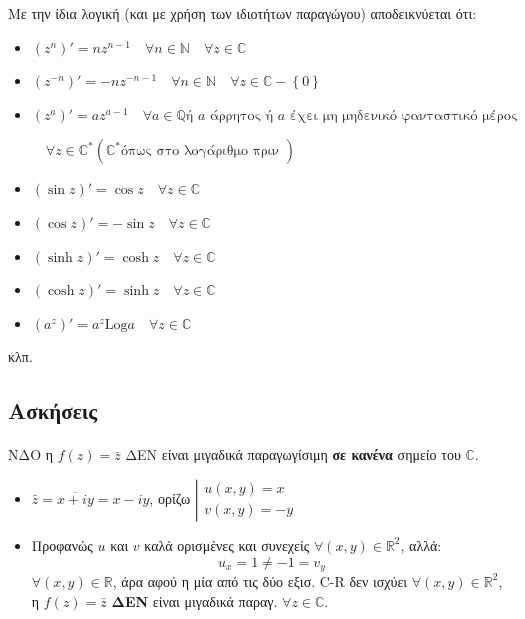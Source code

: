 \documentclass[12pt,a4paper,notitlepage,fleqn]{article}
\begin{document}
	 Με την ίδια λογική (και με χρήση των ιδιοτήτων παραγώγου) αποδεικνύεται ότι:
	 \begin{itemize}
	 	\item \( (z^n)' =nz^{n-1}\quad \forall n\in\mathbb N \quad \forall z\in\mathbb C \)
	 	\item \(
	 	(z^{-n})' = -nz^{-n-1}\quad\forall n\in\mathbb N \quad\forall z\in
	 	\mathbb C - \left\lbrace 0 \right\rbrace
	 	 \)
	    \item \(
	    (z^a)'=az^{a-1}\quad\forall a\in\mathbb Q \text{
	    	ή $a$ άρρητος ή $a$ έχει μη μηδενικό φανταστικό μέρος
	    	}
	     \)
	     
	     \( \quad \forall z\in\mathbb C^* (\mathbb C^* \text{
	     	όπως στο λογάριθμο πριν
	     }) \)
	    \item \( (\sin z)'=\cos z\quad\forall z\in\mathbb C  \)
	    \item \( (\cos z)'=-\sin z \quad\forall z\in\mathbb C  \)
	    \item \( (\sinh z)' = \cosh z\quad\forall z\in\mathbb C \)
	    \item \( (\cosh z)' = \sinh z\quad\forall z\in\mathbb C \)
	    \item \( (a^z)'=a^z\mathrm{Log}a\quad\forall z\in\mathbb C \)
	 \end{itemize}
	 κλπ.

	 \subsection{Ασκήσεις}
	 \paragraph{} ΝΔΟ
	 η \( f(z)=\bar z \) ΔΕΝ είναι μιγαδικά παραγωγίσιμη \textbf{σε κανένα}
	 σημείο του \( \mathbb C \).

	 \begin{itemize}
	 	\item \( \bar z = \overline{x+iy}=x-iy \), ορίζω
	 	\( \left| \begin{array}{l}
	 	u(x,y) = x \\ v(x,y) = -y
	 	\end{array} \right. \)
	 	\item Προφανώς \( u \) και \( v \) καλά ορισμένες και συνεχείς
	 	\( \forall (x,y)\in\mathbb R^2 \), αλλά:
	 	\[
	 	u_x=1\neq -1 = v_y
	 	\]
	 	\( \forall(x,y)\in \mathbb R \), άρα αφού η μία από τις δύο εξισ.
	 	C-R δεν ισχύει \underline{\( \forall(x,y)\in\mathbb R^2 \)},
	 	η \( f(z)=\bar z \) \textbf{ΔΕΝ} είναι μιγαδικά παραγ.
	 	\( \forall z\in\mathbb C \).
	 \end{itemize}
\end{document}
